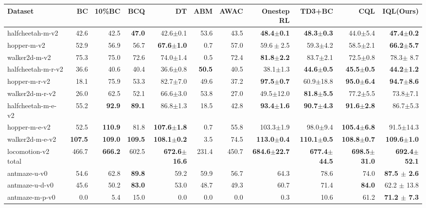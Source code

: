 \documentclass{article} %
\def\ourname{IQL\xspace}
\begin{document}
\begin{table}[t]
\begin{threeparttable}
\tiny
\begin{tabular}{l||rrrrrrrrr|r}
Dataset &BC &10\%BC & BCQ &DT & ABM &AWAC &Onestep RL &TD3+BC &CQL & \ourname (Ours) \\\hline
halfcheetah-m-v2 &42.6 &42.5 & \textbf{47.0} & 42.6$\pm$0.1 & 53.6 & 43.5 &\textbf{48.4$\pm$0.1} &\textbf{48.3$\pm$0.3} &44.0$\pm$5.4 &\textbf{47.4$\pm$0.2} \\
hopper-m-v2 &52.9 &56.9 & 56.7 &\textbf{67.6$\pm$1.0} & 0.7 &57.0 &$59.6\pm$2.5 &59.3$\pm$4.2 &58.5$\pm$2.1 &\textbf{66.2$\pm$5.7} \\
walker2d-m-v2 &75.3 &75.0 & 72.6 &74.0$\pm$1.4 & 0.5 & 72.4 &\textbf{81.8$\pm$2.2} &83.7$\pm$2.1 &72.5$\pm$0.8 &78.3$\pm$ 8.7\\
halfcheetah-m-r-v2 &36.6 &40.6 & 40.4 &36.6$\pm$0.8 & \textbf{50.5} & 40.5 &38.1$\pm$1.3 &\textbf{44.6$\pm$0.5} &\textbf{45.5$\pm$0.5} &\textbf{44.2$\pm$1.2} \\
hopper-m-r-v2 &18.1 &75.9 &53.3 &82.7$\pm$7.0 & 49.6 &37.2 &\textbf{97.5$\pm$0.7} &60.9$\pm$18.8 &\textbf{95.0$\pm$6.4} &\textbf{94.7$\pm$8.6} \\
walker2d-m-r-v2 &26.0 &62.5 & 52.1 &66.6$\pm$3.0 & 53.8 & 27.0 &49.5$\pm$12.0 &\textbf{81.8$\pm$5.5} &77.2$\pm$5.5 &73.8$\pm$7.1 \\
halfcheetah-m-e-v2 &55.2 &\textbf{92.9} &\textbf{89.1} &86.8$\pm$1.3 & 18.5 & 42.8 &
\textbf{93.4$\pm$1.6} &\textbf{90.7$\pm$4.3} &\textbf{91.6$\pm$2.8} &86.7$\pm$5.3 \\
hopper-m-e-v2 &52.5 &\textbf{110.9} & 81.8 &\textbf{107.6$\pm$1.8} & 0.7 & 55.8 &103.3$\pm$1.9 &98.0$\pm$9.4 &\textbf{105.4$\pm$6.8} &91.5$\pm$14.3 \\
walker2d-m-e-v2 &\textbf{107.5} &\textbf{109.0} & \textbf{109.5}&\textbf{108.1$\pm$0.2} & 3.5 & 74.5 &\textbf{113.0$\pm$0.4} &\textbf{110.1$\pm$0.5} &\textbf{108.8$\pm$0.7} &\textbf{109.6$\pm$1.0} \\ \hline
locomotion-v2 total &466.7 &\textbf{666.2} & 602.5 &\textbf{672.6$\pm$16.6} & 231.4 & 450.7 &\textbf{684.6$\pm$22.7} &\textbf{677.4$\pm$44.5} &\textbf{698.5$\pm$31.0} &\textbf{692.4$\pm$52.1} \\ \hline
antmaze-u-v0 &54.6 &62.8 &\textbf{89.8} &59.2 & 59.9 &56.7 &64.3 &78.6 &74.0 &\textbf{87.5 $\pm$ 2.6} \\
antmaze-u-d-v0 &45.6 &50.2 & \textbf{83.0} &53.0 & 48.7 & 49.3 &60.7 &71.4 &\textbf{84.0} &62.2 $\pm$ 13.8 \\
antmaze-m-p-v0 &0.0 &5.4 & 15.0 &0.0 & 0.0 &0.0 &0.3 &10.6 &61.2 &\textbf{71.2 $\pm$ 7.3} \\

\end{tabular}
\end{threeparttable}
\end{table}
\end{document}
